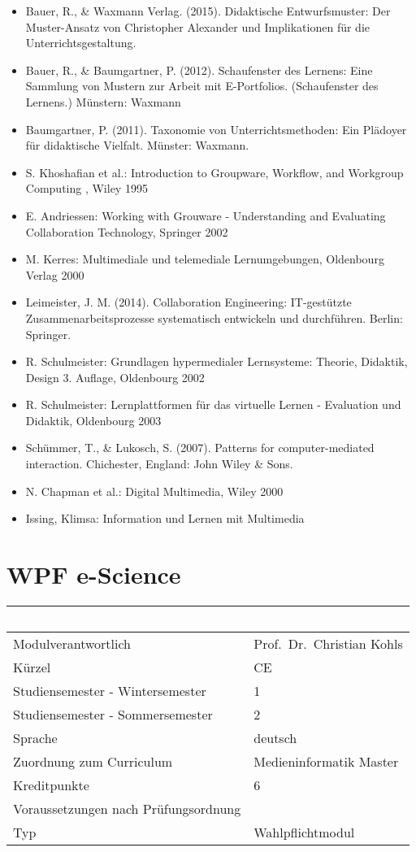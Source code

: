 \begin{itemize}
\item
  Bauer, R., \& Waxmann Verlag. (2015). Didaktische Entwurfsmuster: Der
  Muster-Ansatz von Christopher Alexander und Implikationen für die
  Unterrichtsgestaltung.
\item
  Bauer, R., \& Baumgartner, P. (2012). Schaufenster des Lernens: Eine
  Sammlung von Mustern zur Arbeit mit E-Portfolios. (Schaufenster des
  Lernens.) Münstern: Waxmann
\item
  Baumgartner, P. (2011). Taxonomie von Unterrichtsmethoden: Ein
  Plädoyer für didaktische Vielfalt. Münster: Waxmann.
\item
  S. Khoshafian et al.: Introduction to Groupware, Workflow, and
  Workgroup Computing , Wiley 1995
\item
  E. Andriessen: Working with Grouware - Understanding and Evaluating
  Collaboration Technology, Springer 2002
\item
  M. Kerres: Multimediale und telemediale Lernumgebungen, Oldenbourg
  Verlag 2000
\item
  Leimeister, J. M. (2014). Collaboration Engineering: IT-gestützte
  Zusammenarbeitsprozesse systematisch entwickeln und durchführen.
  Berlin: Springer.
\item
  R. Schulmeister: Grundlagen hypermedialer Lernsysteme: Theorie,
  Didaktik, Design 3. Auflage, Oldenbourg 2002
\item
  R. Schulmeister: Lernplattformen für das virtuelle Lernen - Evaluation
  und Didaktik, Oldenbourg 2003
\item
  Schümmer, T., \& Lukosch, S. (2007). Patterns for computer-mediated
  interaction. Chichester, England: John Wiley \& Sons.
\item
  N. Chapman et al.: Digital Multimedia, Wiley 2000
\item
  Issing, Klimsa: Information und Lernen mit Multimedia
\end{itemize}

\chapter{WPF e-Science}\label{wpf-e-science}

\begin{longtable}[]{@{}ll@{}}
\toprule
~ & ~\tabularnewline
\midrule
\endhead
Modulverantwortlich & Prof.~Dr.~Christian Kohls\tabularnewline
Kürzel & CE\tabularnewline
Studiensemester - Wintersemester & 1\tabularnewline
Studiensemester - Sommersemester & 2\tabularnewline
Sprache & deutsch\tabularnewline
Zuordnung zum Curriculum & Medieninformatik Master\tabularnewline
Kreditpunkte & 6\tabularnewline
Voraussetzungen nach Prüfungsordnung &\tabularnewline
Typ & Wahlpflichtmodul\tabularnewline
\bottomrule
\end{longtable}

